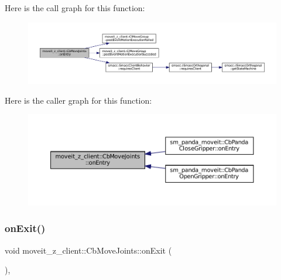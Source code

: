 Here is the call graph for this function\+:
\nopagebreak
\begin{figure}[H]
\begin{center}
\leavevmode
\includegraphics[width=350pt]{classmoveit__z__client_1_1CbMoveJoints_a512e97e94ab05ee12837433e5d921095_cgraph}
\end{center}
\end{figure}
Here is the caller graph for this function\+:
\nopagebreak
\begin{figure}[H]
\begin{center}
\leavevmode
\includegraphics[width=350pt]{classmoveit__z__client_1_1CbMoveJoints_a512e97e94ab05ee12837433e5d921095_icgraph}
\end{center}
\end{figure}
\mbox{\label{classmoveit__z__client_1_1CbMoveJoints_a104abb9c8f8ebb04a6e5c8e84b473add}} 
\subsubsection{\texorpdfstring{on\+Exit()}{onExit()}}
{\footnotesize\ttfamily void moveit\+\_\+z\+\_\+client\+::\+Cb\+Move\+Joints\+::on\+Exit (\begin{DoxyParamCaption}{ }\end{DoxyParamCaption})\hspace{0.3cm}{\ttfamily [override]}, {\ttfamily [virtual]}}



